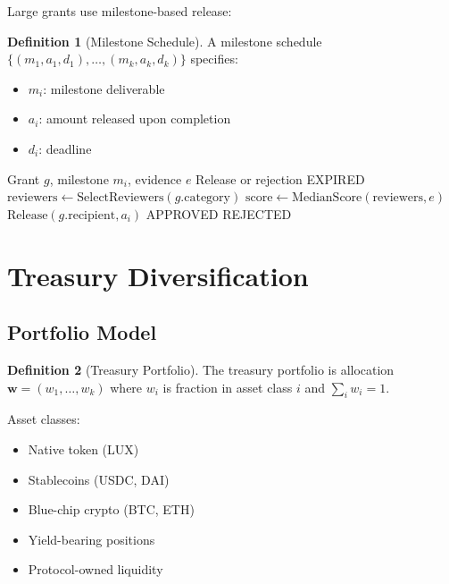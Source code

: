 \documentclass[11pt,a4paper]{article}
\theoremstyle{definition}
\newtheorem{definition}{Definition}[section]
\theoremstyle{remark}
\begin{document}
Large grants use milestone-based release:

\begin{definition}[Milestone Schedule]
A milestone schedule $\{(m_1, a_1, d_1), \ldots, (m_k, a_k, d_k)\}$ specifies:
\begin{itemize}
    \item $m_i$: milestone deliverable
    \item $a_i$: amount released upon completion
    \item $d_i$: deadline
\end{itemize}
\end{definition}

\begin{algorithm}
\caption{Milestone Verification}
\begin{algorithmic}[1]
\Require Grant $g$, milestone $m_i$, evidence $e$
\Ensure Release or rejection
    \State \Return EXPIRED
\EndIf
\State $\text{reviewers} \gets \text{SelectReviewers}(g.\text{category})$
\State $\text{score} \gets \text{MedianScore}(\text{reviewers}, e)$
    \State $\text{Release}(g.\text{recipient}, a_i)$
    \State \Return APPROVED
\Else
    \State \Return REJECTED
\EndIf
\end{algorithmic}
\end{algorithm}

\section{Treasury Diversification}

\subsection{Portfolio Model}

\begin{definition}[Treasury Portfolio]
The treasury portfolio is allocation $\mathbf{w} = (w_1, \ldots, w_k)$ where $w_i$ is fraction in asset class $i$ and $\sum_i w_i = 1$.
\end{definition}

Asset classes:
\begin{itemize}
    \item Native token (LUX)
    \item Stablecoins (USDC, DAI)
    \item Blue-chip crypto (BTC, ETH)
    \item Yield-bearing positions
    \item Protocol-owned liquidity
\end{itemize}
\end{document}
